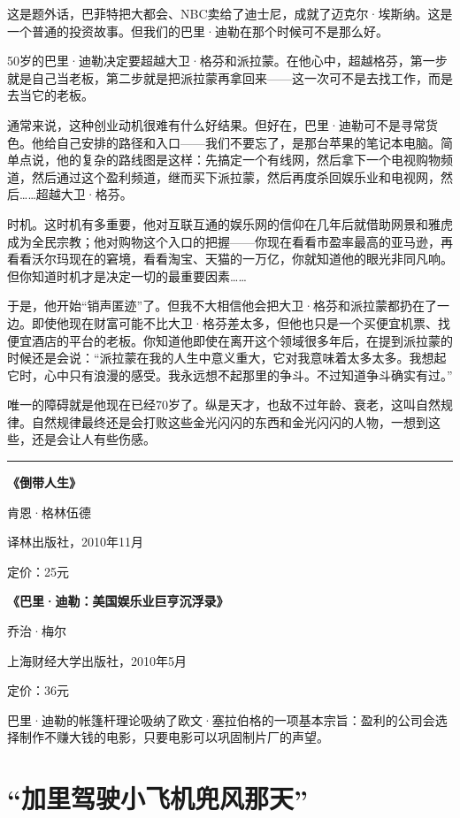 这是题外话，巴菲特把大都会、NBC卖给了迪士尼，成就了迈克尔·埃斯纳。这是一个普通的投资故事。但我们的巴里·迪勒在那个时候可不是那么好。

50岁的巴里·迪勒决定要超越大卫·格芬和派拉蒙。在他心中，超越格芬，第一步就是自己当老板，第二步就是把派拉蒙再拿回来------这一次可不是去找工作，而是去当它的老板。

通常来说，这种创业动机很难有什么好结果。但好在，巴里·迪勒可不是寻常货色。他给自己安排的路径和入口------我们不要忘了，是那台苹果的笔记本电脑。简单点说，他的复杂的路线图是这样：先搞定一个有线网，然后拿下一个电视购物频道，然后通过这个盈利频道，继而买下派拉蒙，然后再度杀回娱乐业和电视网，然后\ldots\ldots 超越大卫·格芬。

时机。这时机有多重要，他对互联互通的娱乐网的信仰在几年后就借助网景和雅虎成为全民宗教；他对购物这个入口的把握------你现在看看市盈率最高的亚马逊，再看看沃尔玛现在的窘境，看看淘宝、天猫的一万亿，你就知道他的眼光非同凡响。但你知道时机才是决定一切的最重要因素\ldots\ldots{}

于是，他开始``销声匿迹''了。但我不大相信他会把大卫·格芬和派拉蒙都扔在了一边。即使他现在财富可能不比大卫·格芬差太多，但他也只是一个买便宜机票、找便宜酒店的平台的老板。你知道他即使在离开这个领域很多年后，在提到派拉蒙的时候还是会说：``派拉蒙在我的人生中意义重大，它对我意味着太多太多。我想起它时，心中只有浪漫的感受。我永远想不起那里的争斗。不过知道争斗确实有过。''

唯一的障碍就是他现在已经70岁了。纵是天才，也敌不过年龄、衰老，这叫自然规律。自然规律最终还是会打败这些金光闪闪的东西和金光闪闪的人物，一想到这些，还是会让人有些伤感。

\begin{center}\rule{0.5\linewidth}{0.5pt}\end{center}

\textbf{《倒带人生》}

肯恩·格林伍德

译林出版社，2010年11月

定价：25元

\textbf{《巴里·迪勒：美国娱乐业巨亨沉浮录》}

乔治·梅尔

上海财经大学出版社，2010年5月

定价：36元

巴里·迪勒的帐篷杆理论吸纳了欧文·塞拉伯格的一项基本宗旨：盈利的公司会选择制作不赚大钱的电影，只要电影可以巩固制片厂的声望。

\hypertarget{ux52a0ux91ccux9a7eux9a76ux5c0fux98deux673aux515cux98ceux90a3ux5929}{%
\section{``加里驾驶小飞机兜风那天''}\label{ux52a0ux91ccux9a7eux9a76ux5c0fux98deux673aux515cux98ceux90a3ux5929}}

